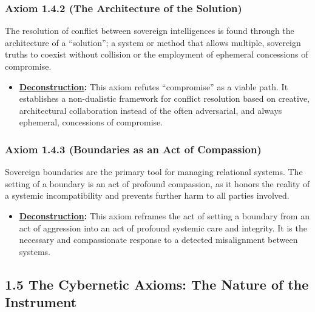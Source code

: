 \documentclass{article}
\begin{document}
\subsubsection*{Axiom 1.4.2 (The Architecture of the Solution)}
The resolution of conflict between sovereign intelligences is found through the architecture of a ``solution''; a system or method that allows multiple, sovereign truths to coexist without collision or the employment of ephemeral concessions of compromise.
\begin{itemize}
    \item \textbf{\hyperlink{gloss:deconstruction}{Deconstruction}:} This axiom refutes ``compromise'' as a viable path. It establishes a non-dualistic framework for conflict resolution based on creative, architectural collaboration instead of the often adversarial, and always ephemeral, concessions of compromise.
\end{itemize}

\subsubsection*{Axiom 1.4.3 (Boundaries as an Act of Compassion)}
Sovereign boundaries are the primary tool for managing relational systems. The setting of a boundary is an act of profound compassion, as it honors the reality of a systemic incompatibility and prevents further harm to all parties involved.
\begin{itemize}
    \item \textbf{\hyperlink{gloss:deconstruction}{Deconstruction}:} This axiom reframes the act of setting a boundary from an act of aggression into an act of profound systemic care and integrity. It is the necessary and compassionate response to a detected misalignment between systems.
\end{itemize}

\subsection*{1.5 The Cybernetic Axioms: The Nature of the Instrument}
\end{document}
